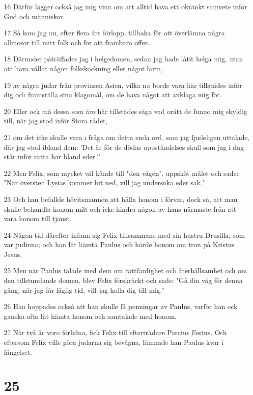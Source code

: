 \par 16 Därför lägger också jag mig vinn om att alltid hava ett okränkt samvete inför Gud och människor.
\par 17 Så kom jag nu, efter flera års förlopp, tillbaka för att överlämna några allmosor till mitt folk och för att frambära offer.
\par 18 Därunder påträffades jag i helgedomen, sedan jag hade låtit helga mig, utan att hava vållat någon folkskockning eller något larm,
\par 19 av några judar från provinsen Asien, vilka nu borde vara här tillstädes inför dig och framställa sina klagomål, om de hava något att anklaga mig för.
\par 20 Eller ock må dessa som äro här tillstädes säga vad orätt de funno mig skyldig till, när jag stod inför Stora rådet,
\par 21 om det icke skulle vara i fråga om detta enda ord, som jag ljudeligen uttalade, där jag stod ibland dem: 'Det är för de dödas uppståndelses skull som jag i dag står inför rätta här bland eder.'"
\par 22 Men Felix, som mycket väl kände till "den vägen", uppsköt målet och sade: "När översten Lysias kommer hit ned, vill jag undersöka eder sak."
\par 23 Och han befallde hövitsmannen att hålla honom i förvar, dock så, att man skulle behandla honom milt och icke hindra någon av hans närmaste från att vara honom till tjänst.
\par 24 Någon tid därefter infann sig Felix tillsammans med sin hustru Drusilla, som var judinna; och han lät hämta Paulus och hörde honom om tron på Kristus Jesus.
\par 25 Men när Paulus talade med dem om rättfärdighet och återhållsamhet och om den tillstundande domen, blev Felix förskräckt och sade: "Gå din väg för denna gång; när jag får läglig tid, vill jag kalla dig till mig."
\par 26 Han hoppades också att han skulle få penningar av Paulus, varför han ock ganska ofta lät hämta honom och samtalade med honom.
\par 27 När två år voro förlidna, fick Felix till efterträdare Porcius Festus. Och eftersom Felix ville göra judarna sig bevågna, lämnade han Paulus kvar i fängelset.

\chapter{25}

